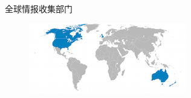 \documentclass[11pt]{beamer}
\begin{document}
\begin{frame}{全球情报收集部门}
\begin{minipage}[t]{0.4\linewidth}
\begin{figure}
{\begin{minipage}[b]{0.5\linewidth}
			\end{minipage}%
			\begin{minipage}[b]{0.5\linewidth}
				\includegraphics[width=\linewidth]{figures/privacy/UKUSA.png}
			\end{minipage}%
		}
		
	\end{figure}
\end{minipage}%
\end{frame}
\end{document}

